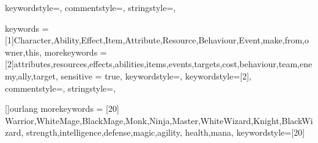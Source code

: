 
{
	keywordstyle=\color{blue},          %
	commentstyle=\color{dkgreen},       %
	stringstyle=\color{mauve},         %
}

{
	keywords = {[1]Character,Ability,Effect,Item,Attribute,Resource,Behaviour,Event,make,from,owner,this},
	morekeywords = {[2]attributes,resources,effects,abilities,items,events,targets,cost,behaviour,team,enemy,ally,target},
	sensitive = true,
	keywordstyle=\color{blue},          %
	keywordstyle={[2]\color{dkgreen}},
	commentstyle=\color{dkgreen},       %
	stringstyle=\color{mauve},         %
}

[]{ourlang}
{
	morekeywords = [20]{
		Warrior,WhiteMage,BlackMage,Monk,Ninja,Master,WhiteWizard,Knight,BlackWizard,
		strength,intelligence,defense,magic,agility,
		health,mana},
	keywordstyle={[20]\color{orange}}
}